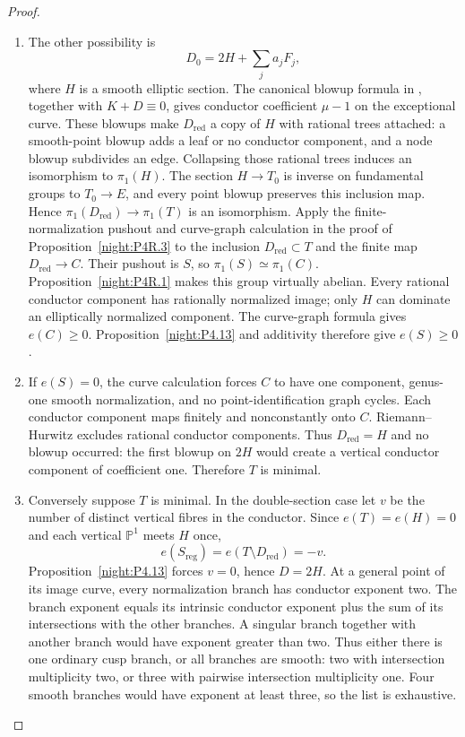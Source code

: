 \begin{proof}
\begin{enumerate}[label={$\langle1\rangle$\arabic*.},leftmargin=*]
\item The other possibility is
\[
 D_0=2H+\sum_j a_jF_j,
\]
where $H$ is a smooth elliptic section. The canonical blowup
formula in \cite[II.3, pp.~17--18]{Beauville1978}, together with
$K+D\equiv0$, gives conductor coefficient $\mu-1$ on the exceptional
curve. These blowups make $D_{\mathrm{red}}$ a copy of $H$ with rational trees attached:
a smooth-point blowup adds a leaf or no conductor component,
and a node blowup subdivides an edge. Collapsing those rational
trees induces an isomorphism to $\pi_1(H)$. The section
$H\to T_0$ is inverse on fundamental groups to $T_0\to E$,
and every point blowup preserves this inclusion map. Hence
$\pi_1(D_{\mathrm{red}})\to\pi_1(T)$ is an isomorphism.
Apply the finite-normalization pushout and curve-graph calculation
in the proof of Proposition~\ref{night:P4R.3} to the inclusion
$D_{\mathrm{red}}\subset T$ and the finite map
$D_{\mathrm{red}}\to C$. Their pushout is $S$, so
$\pi_1(S)\simeq\pi_1(C)$.
Proposition~\ref{night:P4R.1} makes this group virtually abelian.
Every rational conductor component has rationally normalized image;
only $H$ can dominate an elliptically normalized component.
The curve-graph formula gives $e(C)\ge0$.
Proposition~\ref{night:P4.13} and additivity therefore give $e(S)\ge0$.

\item If $e(S)=0$, the curve calculation forces $C$ to have
one component, genus-one smooth normalization, and
no point-identification graph cycles. Each conductor
component maps finitely and nonconstantly onto $C$.
Riemann--Hurwitz excludes rational conductor
components. Thus $D_{\mathrm{red}}=H$ and no blowup
occurred: the first blowup on $2H$ would create a
vertical conductor component of coefficient one.
Therefore $T$ is minimal.

\item Conversely suppose $T$ is minimal. In the double-section
case let $v$ be the number of distinct vertical fibres
in the conductor. Since $e(T)=e(H)=0$ and each vertical
$\mathbb P^1$ meets $H$ once,
\[
 e(S_{\mathrm{reg}})=e(T\setminus D_{\mathrm{red}})=-v.
\]
Proposition~\ref{night:P4.13} forces $v=0$, hence $D=2H$. At a general point
of its image curve, every normalization branch has
conductor exponent two. The branch exponent equals
its intrinsic conductor exponent plus the sum of its
intersections with the other branches. A singular
branch together with another branch would have
exponent greater than two. Thus either there is one
ordinary cusp branch, or all branches are smooth:
two with intersection multiplicity two, or three
with pairwise intersection multiplicity one. Four
smooth branches would have exponent at least three,
so the list is exhaustive.


\end{enumerate}
\end{proof}
